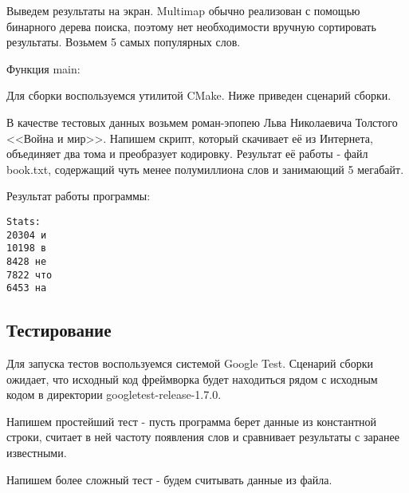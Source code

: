 % 

Выведем результаты на экран. Multimap обычно реализован с помощью бинарного дерева поиска, поэтому нет необходимости вручную сортировать результаты. Возьмем 5 самых популярных слов.

% 

Функция main:

% 

Для сборки воспользуемся утилитой CMake. Ниже приведен сценарий сборки.

% 

В качестве тестовых данных возьмем роман-эпопею Льва Николаевича Толстого <<Война и мир>>. Напишем скрипт, который скачивает её из Интернета, объединяет два тома и преобразует кодировку. Результат её работы - файл book.txt, содержащий чуть менее полумиллиона слов и занимающий 5 мегабайт.

% 

Результат работы программы:

\begin{lstlisting}
Stats: 
20304 и 
10198 в 
8428 не 
7822 что 
6453 на 
\end{lstlisting}

\subsection{Тестирование}
Для запуска тестов воспользуемся системой Google Test. Сценарий сборки ожидает, что исходный код фреймворка будет находиться рядом с исходным кодом в директории googletest-release-1.7.0.

Напишем простейший тест - пусть программа берет данные из константной строки, считает в ней частоту появления слов и сравнивает результаты с заранее известными.

% 

Напишем более сложный тест - будем считывать данные из файла.

% 

